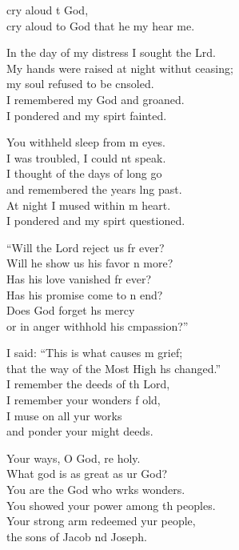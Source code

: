\begin{psalmverse}
  \begin{patverse}
     cry aloud t God,\Med\\
cry aloud to God that he my hear me.

In the day of my distress I sought the Lrd.\Flex\\
My hands were raised at night withut ceasing;\Med\\
my soul refused to be cnsoled.\\
I remembered my God and  groaned.\Med\\
I pondered and my spir\pointup{\i}t fainted.

You withheld sleep from m eyes.\Med\\
I was troubled, I could nt speak.\\
I thought of the days of long go\Med\\
and remembered the years lng past.\\
At night I mused within m heart.\Med\\
I pondered and my spir\pointup{\i}t questioned.

“Will the Lord reject us fr ever?\Med\\
Will he show us his favor n more?\\
Has his love vanished fr ever?\Med\\
Has his promise come to n end?\\
Does God forget h\pointup{\i}s mercy\Med\\
or in anger withhold his cmpassion?”

I said: “This is what causes m grief;\Med\\
that the way of the Most High hs changed.”\\
I remember the deeds of th Lord,\Med\\
I remember your wonders f old,\\
I muse on all yur works\Med\\
and ponder your might deeds.

Your ways, O God, re holy.\Med\\
What god is as great as ur God?\\
You are the God who wrks wonders.\Med\\
You showed your power among th peoples.\\
Your strong arm redeemed yur people,\Med\\
the sons of Jacob nd Joseph.


\end{patverse}
\end{psalmverse}
